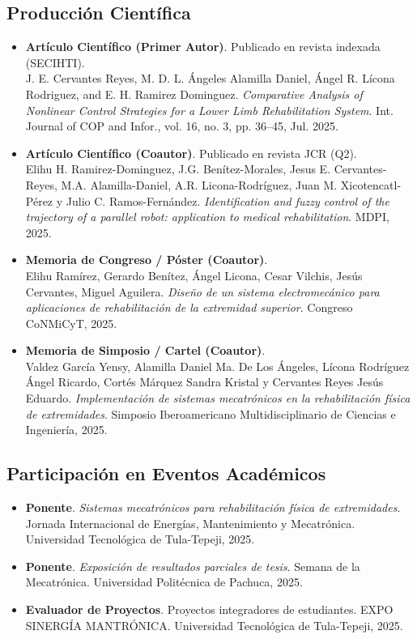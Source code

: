 \documentclass[a4paper,12pt]{article}
\begin{document}
\subsection{Producción Científica}
\begin{itemize}
    \item \textbf{Artículo Científico (Primer Autor)}. Publicado en revista indexada (SECIHTI). \\
          J. E. Cervantes Reyes, M. D. L. Ángeles Alamilla Daniel, Ángel R. Lícona Rodriguez, and E. H. Ramirez Dominguez. \textit{Comparative Analysis of Nonlinear Control Strategies for a Lower Limb Rehabilitation System}. Int. Journal of COP and Infor., vol. 16, no. 3, pp. 36--45, Jul. 2025.

    \item \textbf{Artículo Científico (Coautor)}. Publicado en revista JCR (Q2). \\
          Elihu H. Ramirez-Dominguez, J.G. Benítez-Morales, Jesus E. Cervantes-Reyes, M.A. Alamilla-Daniel, A.R. Licona-Rodríguez, Juan M. Xicotencatl-Pérez y Julio C. Ramos-Fernández. \textit{Identification and fuzzy control of the trajectory of a parallel robot: application to medical rehabilitation}. MDPI, 2025.

    \item \textbf{Memoria de Congreso / Póster (Coautor)}. \\
          Elihu Ramírez, Gerardo Benítez, Ángel Licona, Cesar Vilchis, Jesús Cervantes, Miguel Aguilera. \textit{Diseño de un sistema electromecánico para aplicaciones de rehabilitación de la extremidad superior}. Congreso CoNMiCyT, 2025.

    \item \textbf{Memoria de Simposio / Cartel (Coautor)}. \\
          Valdez García Yensy, Alamilla Daniel Ma. De Los Ángeles, Lícona Rodríguez Ángel Ricardo, Cortés Márquez Sandra Kristal y Cervantes Reyes Jesús Eduardo. \textit{Implementación de sistemas mecatrónicos en la rehabilitación física de extremidades}. Simposio Iberoamericano Multidisciplinario de Ciencias e Ingeniería, 2025.
\end{itemize}

\subsection{Participación en Eventos Académicos}
\begin{itemize}
    \item \textbf{Ponente}. \textit{Sistemas mecatrónicos para rehabilitación física de extremidades}. Jornada Internacional de Energías, Mantenimiento y Mecatrónica. Universidad Tecnológica de Tula-Tepeji, 2025.

    \item \textbf{Ponente}. \textit{Exposición de resultados parciales de tesis}. Semana de la Mecatrónica. Universidad Politécnica de Pachuca, 2025.

    \item \textbf{Evaluador de Proyectos}. Proyectos integradores de estudiantes. EXPO SINERGÍA MANTRÓNICA. Universidad Tecnológica de Tula-Tepeji, 2025.
\end{itemize}
\end{document}
